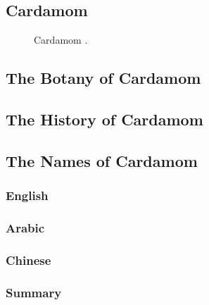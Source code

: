 \subsection{Cardamom}
\label{sec:cardamom}



\begin{figure}[!ht]
	\vspace{-4ex}
	\centering
	\hfill
	\hfill
	\caption{Cardamom \textit{}.}
	\label{fig:cardamom_imgs}
\end{figure}

\subsection{The Botany of Cardamom}

\subsection{The History of Cardamom}

\subsection{The Names of Cardamom}

\subsubsection{English}





\subsubsection{Arabic}



\subsubsection{Chinese}



\subsubsection{Summary}

